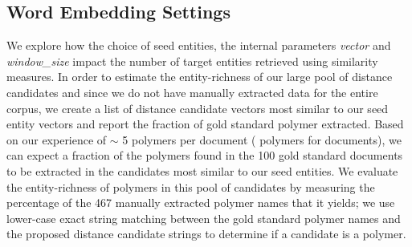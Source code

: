 \subsection{Word Embedding Settings}
We explore how the choice of seed entities, the internal parameters \textit{vector} and \textit{window_size}  impact the number of target entities retrieved using similarity measures.
In order to estimate the entity-richness of our large pool of distance candidates and since we do not have manually extracted data for the entire corpus, we create a list of  distance candidate vectors most similar to our seed entity vectors and report the fraction of gold standard polymer extracted. 
Based on our experience of $\sim$ 5 polymers per document ( polymers for  documents), we can expect a fraction of the polymers found in the 100 gold standard documents to be extracted in the  candidates most similar to our seed entities.
We evaluate the entity-richness of polymers in this pool of candidates by measuring the percentage of the 467 manually extracted polymer names that it yields;
we use lower-case exact string matching between the gold standard polymer names and the proposed distance candidate strings to determine if a candidate is a polymer.\\


